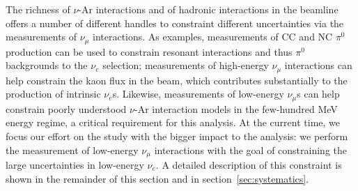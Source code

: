 \documentclass[a4paper]{article}
\begin{document}

\par The richness of $\nu$-Ar interactions and of hadronic interactions in the beamline offers a number of different handles 
to constraint different uncertainties via the measurements of $\nu_{\mu}$ interactions.
As examples, measurements of CC and NC $\pi^0$ production can be used to constrain resonant interactions and thus $\pi^0$ backgrounds to the $\nu_e$ selection;  measurements of high-energy $\nu_{\mu}$ interactions can help constrain the kaon flux in the beam, which contributes substantially to the production of intrinsic $\nu_e$s. Likewise, measurements of low-energy $\nu_{\mu}$s can help constrain poorly understood $\nu$-Ar interaction models in the few-hundred MeV energy regime, a critical requirement for this analysis.  At the current time, we focus our effort on the study with the bigger impact to the analysis: we perform the measurement of low-energy $\nu_{\mu}$ interactions with the goal of constraining the large uncertainties in low-energy $\nu_e$. A detailed  description of this constraint is shown in the remainder of this section and in section~\ref{sec:systematics}.
\end{document}

